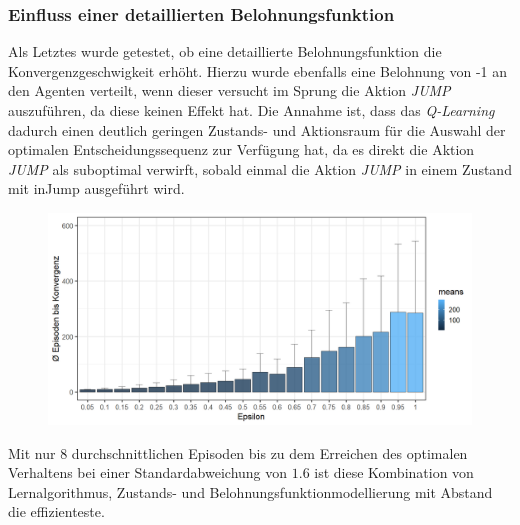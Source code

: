 \subsubsection*{Einfluss einer detaillierten Belohnungsfunktion}
Als Letztes wurde getestet, ob eine detaillierte Belohnungsfunktion die Konvergenzgeschwigkeit erhöht. Hierzu wurde ebenfalls eine Belohnung von -1 an den Agenten verteilt, wenn dieser versucht im Sprung die Aktion \textit{JUMP} auszuführen, da diese keinen Effekt hat. Die Annahme ist, dass das \textit{Q-Learning} dadurch einen deutlich geringen Zustands- und Aktionsraum für die Auswahl der optimalen Entscheidungssequenz zur Verfügung hat, da es direkt  die Aktion \textit{JUMP} als suboptimal verwirft, sobald einmal die Aktion \textit{JUMP} in einem Zustand mit \glqq inJump\grqq{} ausgeführt wird. 
\begin{figure}[H]
    \centering
    \includegraphics[width=\textwidth]{images/SimpleZ2B4QLearningA}
    \label{fig:test1}
\end{figure}
Mit nur 8 durchschnittlichen Episoden bis zu dem Erreichen des optimalen Verhaltens bei einer Standardabweichung von $1.6$ ist diese Kombination von Lernalgorithmus, Zustands- und Belohnungsfunktionmodellierung mit Abstand die effizienteste.

